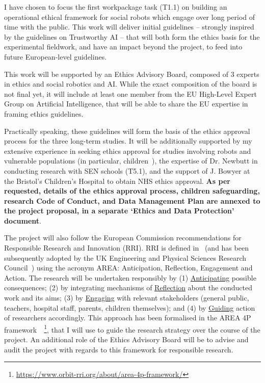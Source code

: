 I have chosen to focus the first workpackage task (T1.1) on building an
operational ethical framework for social robots which engage over long period of
time with the public. This work will deliver initial guidelines -- strongly
inspired by the guidelines on Trustworthy AI -- that will both form the ethics
basis for the \project experimental fieldwork, and have an impact beyond the
project, to feed into future European-level guidelines.

This work will be supported by an Ethics Advisory Board, composed of 3 experts
in ethics and social robotics and AI. While the exact composition of the board
is not final yet, it will include at least one member from the EU High-Level
Expert Group on Artificial Intelligence, that will be able to share the EU
expertise in framing ethics guidelines.

Practically speaking, these guidelines will form the basis of the ethics
approval process for the three long-term \project studies. It will be
additionally supported by my extensive experience in seeking ethics approval for
studies involving robots and vulnerable populations (in particular,
children~\cite{lemaignan2016learning,lemaignan2018pinsoro,senft2019teaching}),
the expertise of Dr. Newbutt in conducting research with SEN schools (T5.1), and
the support of J. Bowyer at the Bristol's Children's Hospital to obtain NHS ethics
approval. \textbf{As per requested, details of the ethics approval process,
children safeguarding, research Code of Conduct, and Data Management Plan are
annexed to the project proposal, in a separate `Ethics and Data Protection'
document}.

The project will also follow the European Commission recommendations for
Responsible Research and Innovation (RRI). RRI is defined
in~\cite{stilgoe2013developing} (and has been subsequently adopted by the UK Engineering
and Physical Sciences Research Council~\cite{owen2014uk}) using the acronym
AREA: Anticipation, Reflection, Engagement and Action. The \project research
will be undertaken responsibly by (1) \ul{Anticipating} possible consequences;
(2) by integrating mechanisms of \ul{Reflection} about the conducted work and its
aims; (3) by \ul{Engaging} with relevant stakeholders (general public, teachers,
hospital staff, parents, children themselves); and (4) by \ul{Guiding} action of
researchers accordingly. This approach has been formalised in the AREA 4P
framework~\cite{stahl2018implementing}~\footnote{\url{https://www.orbit-rri.org/about/area-4p-framework/}},
that I will use to guide the research strategy over the course of the project.
An additional role of the Ethics Advisory Board will be to advise and audit the
project with regards to this framework for responsible research.



